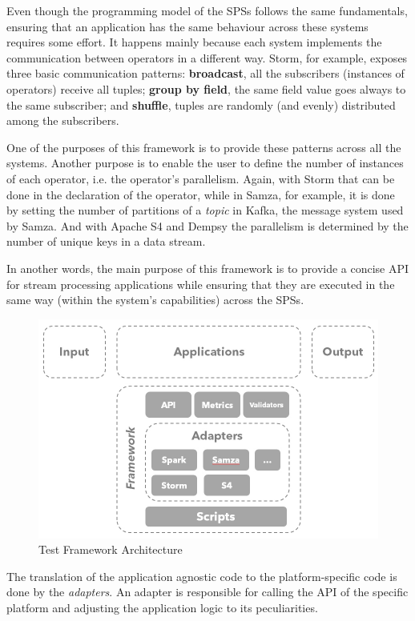 \documentclass[ppgc,diss,english]{iiufrgs}
\begin{document}
Even though the programming model of the SPSs follows the same fundamentals, ensuring that an application has the same behaviour across these systems requires some effort. It happens mainly because each system implements the communication between operators in a different way. Storm, for example, exposes three basic communication patterns: \textbf{broadcast}, all the subscribers (instances of operators) receive all tuples; \textbf{group by field}, the same field value goes always to the same subscriber; and \textbf{shuffle}, tuples are randomly (and evenly) distributed among the subscribers.

One of the purposes of this framework is to provide these patterns across all the systems. Another purpose is to enable the user to define the number of instances of each operator, i.e. the operator's parallelism. Again, with Storm that can be done in the declaration of the operator, while in Samza, for example, it is done by setting the number of partitions of a \textit{topic} in Kafka, the message system used by Samza. And with Apache S4 and Dempsy the parallelism is determined by the number of unique keys in a data stream.

In another words, the main purpose of this framework is to provide a concise API for stream processing applications while ensuring that they are executed in the same way (within the system's capabilities) across the SPSs.

\begin{figure}[ht!]
	\centering
	\includegraphics[width=.8\textwidth]{images/architecture.jpg}
	\caption{Test Framework Architecture}
	\label{fig:framework_architecture}
\end{figure}

The translation of the application agnostic code to the platform-specific code is done by the \textit{adapters}. An adapter is responsible for calling the API of the specific platform and adjusting the application logic to its peculiarities.
\end{document}
